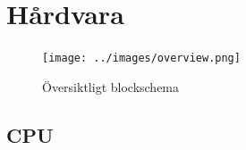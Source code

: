 \documentclass[a4paper,titlepage]{article}
\begin{document}

\newpage
\section{Hårdvara}


\begin{figure}[h!]
	\centering
	\texttt{[image: ../images/overview.png]}
	\caption{Översiktligt blockschema}
\end{figure}

\subsection{CPU}
\end{document}
